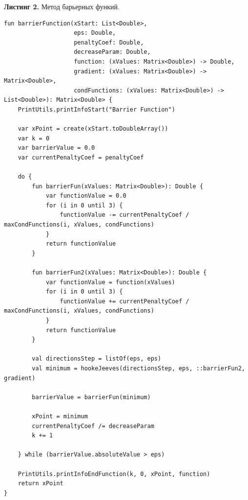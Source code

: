 \documentclass[a4paper, 12pt]{article}   	%
\begin{document}
    \textbf{Листинг 2.} Метод барьерных функий.
    \begin{verbatim}
fun barrierFunction(xStart: List<Double>,
                    eps: Double,
                    penaltyCoef: Double,
                    decreaseParam: Double,
                    function: (xValues: Matrix<Double>) -> Double,
                    gradient: (xValues: Matrix<Double>) -> Matrix<Double>,
                    condFunctions: (xValues: Matrix<Double>) -> List<Double>): Matrix<Double> {
    PrintUtils.printInfoStart("Barrier Function")

    var xPoint = create(xStart.toDoubleArray())
    var k = 0
    var barrierValue = 0.0
    var currentPenaltyCoef = penaltyCoef

    do {
        fun barrierFun(xValues: Matrix<Double>): Double {
            var functionValue = 0.0
            for (i in 0 until 3) {
                functionValue -= currentPenaltyCoef / maxCondFunctions(i, xValues, condFunctions)
            }
            return functionValue
        }

        fun barrierFun2(xValues: Matrix<Double>): Double {
            var functionValue = function(xValues)
            for (i in 0 until 3) {
                functionValue += currentPenaltyCoef / maxCondFunctions(i, xValues, condFunctions)
            }
            return functionValue
        }

        val directionsStep = listOf(eps, eps)
        val minimum = hookeJeeves(directionsStep, eps, ::barrierFun2, gradient)

        barrierValue = barrierFun(minimum)

        xPoint = minimum
        currentPenaltyCoef /= decreaseParam
        k += 1

    } while (barrierValue.absoluteValue > eps)

    PrintUtils.printInfoEndFunction(k, 0, xPoint, function)
    return xPoint
}
    \end{verbatim}
    
\end{document}
